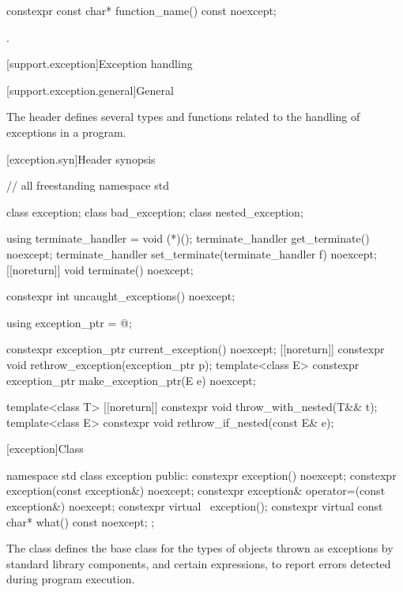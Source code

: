 \begin{itemdecl}
constexpr const char* function_name() const noexcept;
\end{itemdecl}
\begin{itemdescr}
\pnum
\returns
{}.
\end{itemdescr}

[support.exception]{Exception handling}

[support.exception.general]{General}

\pnum
The header 
defines several types and functions related to the handling of exceptions in a \Cpp{} program.

[exception.syn]{Header  synopsis}

\begin{codeblock}
// all freestanding
namespace std {
  class exception;
  class bad_exception;
  class nested_exception;

  using terminate_handler = void (*)();
  terminate_handler get_terminate() noexcept;
  terminate_handler set_terminate(terminate_handler f) noexcept;
  [[noreturn]] void terminate() noexcept;

  constexpr int uncaught_exceptions() noexcept;

  using exception_ptr = @\unspec@;

  constexpr exception_ptr current_exception() noexcept;
  [[noreturn]] constexpr void rethrow_exception(exception_ptr p);
  template<class E> constexpr exception_ptr make_exception_ptr(E e) noexcept;

  template<class T> [[noreturn]] constexpr void throw_with_nested(T&& t);
  template<class E> constexpr void rethrow_if_nested(const E& e);
}
\end{codeblock}

[exception]{Class }

%
%
\begin{codeblock}
namespace std {
  class exception {
  public:
    constexpr exception() noexcept;
    constexpr exception(const exception&) noexcept;
    constexpr exception& operator=(const exception&) noexcept;
    constexpr virtual ~exception();
    constexpr virtual const char* what() const noexcept;
  };
}
\end{codeblock}

\pnum
The class
defines the base
class for the types of objects thrown as exceptions by
\Cpp{} standard library components, and certain
expressions, to report errors detected during program execution.

